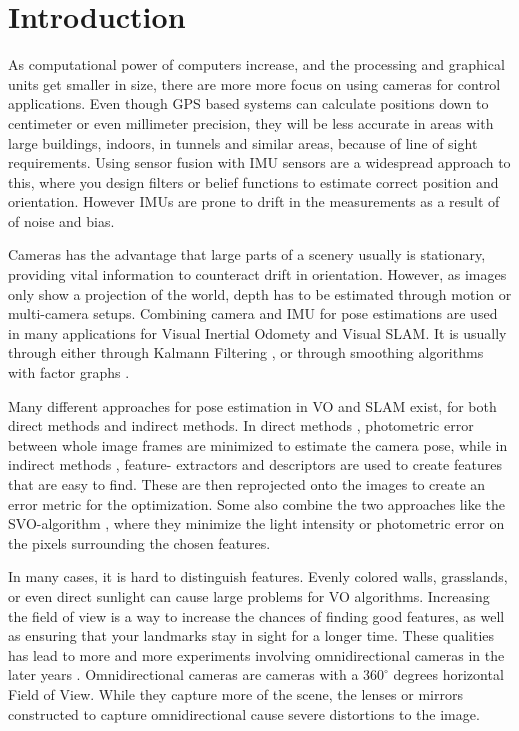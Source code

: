 
\chapter{Introduction} \label{chap:introduction}

As computational power of computers increase, and the processing and graphical units get smaller in size, there are more more focus on using cameras for control applications. Even though GPS based systems can calculate positions down to centimeter or even millimeter precision\cite{GPSaccuracy}, they will be less accurate in areas with large buildings, indoors, in tunnels and similar areas, because of line of sight requirements. Using sensor fusion with IMU sensors are a widespread approach to this, where you design filters or belief functions to estimate correct position and orientation. However IMUs are prone to drift in the measurements as a result of of noise and bias.

Cameras has the advantage that large parts of a scenery usually is stationary, providing vital information to counteract drift in orientation. However, as images only show a projection of the world, depth has to be estimated through motion or multi-camera setups. Combining camera and IMU for pose estimations are used in many applications for Visual Inertial Odomety and Visual SLAM. It is usually through either through Kalmann Filtering \cite{RealTimeKalmannSLAM, HighPrecKalmannVIO, OmniVIOKalman}, or through smoothing algorithms with factor graphs \cite{OnManiIntgrVIO, KeyFrameVIO}.

Many different approaches for pose estimation in VO and SLAM exist, for both direct methods and indirect methods. In direct methods \cite{DTAMdirect, LSDSLAMdirect}, photometric error between whole image frames are minimized to estimate the camera pose, while in indirect methods \cite{ORBSLAMindirect, 2yMarsndirect}, feature- extractors and descriptors are used to create features that are easy to find. These are then reprojected onto the images to create an error metric for the optimization. Some also combine the two approaches like the SVO-algorithm \cite{SVOpaper}, where they minimize the light intensity or photometric error on the pixels surrounding the chosen features.

In many cases, it is hard to distinguish features. Evenly colored walls, grasslands, or even direct sunlight can cause large problems for VO algorithms. Increasing the field of view is a way to increase the chances of finding good features, as well as ensuring that your landmarks stay in sight for a longer time. These qualities has lead to more and more experiments involving omnidirectional cameras in the later years \cite{CompOmniConvVSLAM, Zhang2016BenefitOL, OmniVIOKalman, OmniDenseSLAM}. Omnidirectional cameras are cameras with a $360^\circ$ degrees horizontal Field of View. While they capture more of the scene, the lenses or mirrors constructed to capture omnidirectional cause severe distortions to the image.

